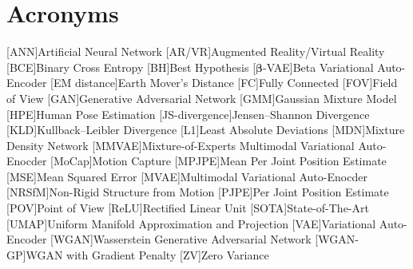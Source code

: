 \chapter*{Acronyms}

\begin{acronym}[TBD]
    [ANN]{Artificial Neural Network}
    [AR/VR]{Augmented Reality/Virtual Reality}
    [BCE]{Binary Cross Entropy}
    [BH]{Best Hypothesis}
    [$\boldsymbol{\beta}$-VAE]{Beta Variational Auto-Encoder}
    [EM distance]{Earth Mover's Distance}
    [FC]{Fully Connected}
    [FOV]{Field of View}
    [GAN]{Generative Adversarial Network}
    [GMM]{Gaussian Mixture Model}
    [HPE]{Human Pose Estimation}
    [JS-divergence]{Jensen–Shannon Divergence}
    [KLD]{Kullback–Leibler Divergence}
    [L1]{Least Absolute Deviations}
    [MDN]{Mixture Density Network}
    [MMVAE]{Mixture-of-Experts Multimodal Variational Auto-Enocder}
    [MoCap]{Motion Capture}
    [MPJPE]{Mean Per Joint Position Estimate}
    [MSE]{Mean Squared Error}
    [MVAE]{Multimodal Variational Auto-Enocder}
    [NRSfM]{Non-Rigid Structure from Motion}
    [PJPE]{Per Joint Position Estimate}
    [POV]{Point of View}
    [ReLU]{Rectified Linear Unit}
    [SOTA]{State-of-The-Art}
    [UMAP]{Uniform Manifold Approximation and Projection}
    [VAE]{Variational Auto-Encoder}
    [WGAN]{Wasserstein Generative Adversarial Network}
    [WGAN-GP]{WGAN with Gradient Penalty}
    [ZV]{Zero Variance}
\end{acronym}

